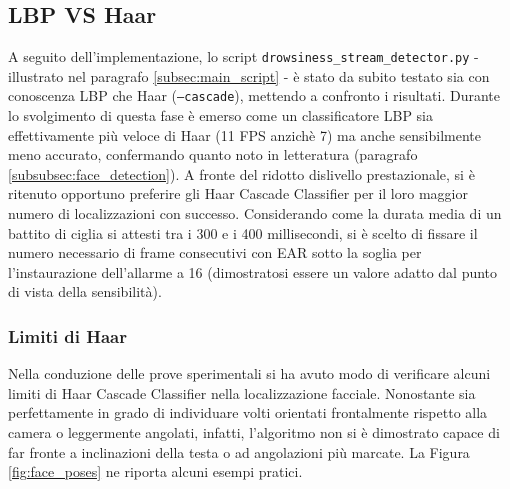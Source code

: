 \documentclass[12pt]{article}
\begin{document}
\subsection{LBP VS Haar}
A seguito dell'implementazione, lo script \texttt{drowsiness\_stream\_detector.py} - illustrato nel paragrafo \ref{subsec:main_script} -  è stato da subito testato sia con conoscenza LBP che Haar (\texttt{--cascade}), mettendo a confronto i risultati. Durante lo svolgimento di questa fase è emerso come un classificatore LBP sia effettivamente più veloce di Haar (11 FPS anzichè 7) ma anche sensibilmente meno accurato, confermando quanto noto in letteratura (paragrafo \ref{subsubsec:face_detection}). A fronte del ridotto dislivello prestazionale, si è ritenuto opportuno preferire gli Haar Cascade Classifier per il loro maggior numero di localizzazioni con successo. Considerando come la durata media di un battito di ciglia si attesti tra i 300 e i 400 millisecondi, si è scelto di fissare il numero necessario di frame consecutivi con EAR sotto la soglia per l'instaurazione dell'allarme a 16 (dimostratosi essere un valore adatto dal punto di vista della sensibilità).

\subsubsection{Limiti di Haar}
Nella conduzione delle prove sperimentali si ha avuto modo di verificare alcuni limiti di Haar Cascade Classifier nella localizzazione facciale. Nonostante sia perfettamente in grado di individuare volti orientati frontalmente rispetto alla camera o leggermente angolati, infatti, l'algoritmo non si è dimostrato capace di far fronte a inclinazioni della testa o ad angolazioni più marcate. La Figura \ref{fig:face_poses} ne riporta alcuni esempi pratici.
\end{document}
